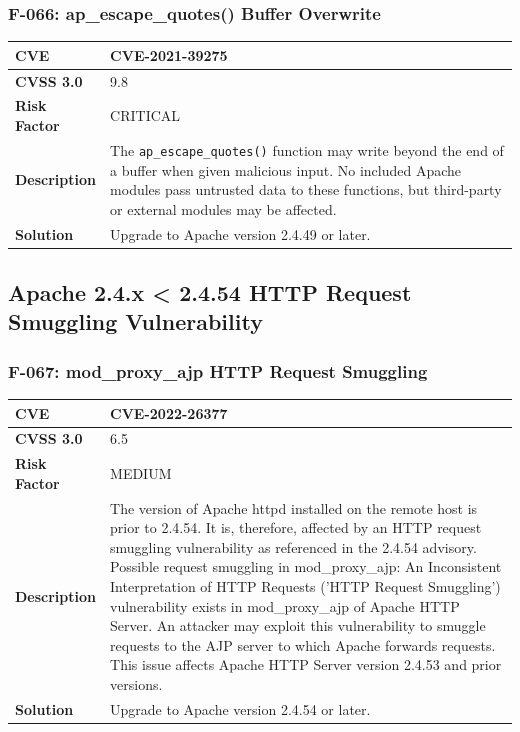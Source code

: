 \subsubsection{F-066: ap\_escape\_quotes() Buffer Overwrite}
\begin{tabular}{|p{2.8cm}|p{12.2cm}|}
\hline
\textbf{CVE} & CVE-2021-39275 \\ \hline
\textbf{CVSS 3.0} & 9.8 \\ \hline
\textbf{Risk Factor} & CRITICAL \\ \hline
\textbf{Description} & The \texttt{ap\_escape\_quotes()} function may write beyond the end of a buffer when given malicious input. No included Apache modules pass untrusted data to these functions, but third-party or external modules may be affected. \\ \hline
\textbf{Solution} & Upgrade to Apache version 2.4.49 or later. \\ \hline
\end{tabular}

%
%
\subsection{Apache 2.4.x < 2.4.54 HTTP Request Smuggling Vulnerability}

\subsubsection{F-067: mod\_proxy\_ajp HTTP Request Smuggling}
\begin{tabular}{|p{2.8cm}|p{12.2cm}|}
\hline
\textbf{CVE} & CVE-2022-26377 \\ \hline
\textbf{CVSS 3.0} & 6.5 \\ \hline
\textbf{Risk Factor} & MEDIUM \\ \hline
\textbf{Description} & The version of Apache httpd installed on the remote host is prior to 2.4.54. It is, therefore, affected by an HTTP request smuggling vulnerability as referenced in the 2.4.54 advisory. Possible request smuggling in mod\_proxy\_ajp: An Inconsistent Interpretation of HTTP Requests ('HTTP Request Smuggling') vulnerability exists in mod\_proxy\_ajp of Apache HTTP Server. An attacker may exploit this vulnerability to smuggle requests to the AJP server to which Apache forwards requests. This issue affects Apache HTTP Server version 2.4.53 and prior versions. \\ \hline
\textbf{Solution} & Upgrade to Apache version 2.4.54 or later. \\ \hline
\end{tabular}

